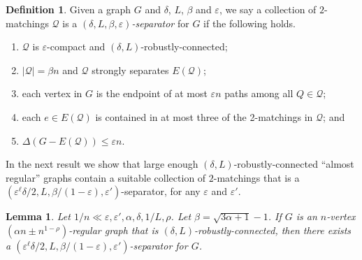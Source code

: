 \documentclass[a4paper, 11pt,reqno]{amsart}
\newcommand{\calQ}{\mathcal{Q}}
\theoremstyle{plain}
\newtheorem{lemma}[theorem]{Lemma}
\theoremstyle{definition}
\newtheorem{definition}[theorem]{Definition}
\numberwithin{equation}{section}
\newcommand{\eps}{\varepsilon}
\begin{document}
\begin{definition} \label{definition:separator}
  Given a graph $G$ and $\delta$, $L$, $\beta$ and $\eps$, we say a
  collection of $2$-matchings $\calQ$ is a \emph{$(\delta,
    L,\beta,\eps)$-separator} for $G$ if the following holds.
  \begin{enumerate}[\upshape{\textbf{(Q\arabic*)}},labelindent=0pt,labelwidth=\widthof{\ref{item:firstpacking-separating}},leftmargin=!]
  \item \label{item:firstpacking-connecting} $\calQ$ is $\eps$-compact and $(\delta,L)$-robustly-connected;
  \item \label{item:firstpacking-separating} $|\calQ| = \beta n$ and $\calQ$ strongly separates $E(\calQ)$;
  \item \label{item:firstpacking-endpoints} each vertex in $G$ is the endpoint of at most $\eps n$ paths among all $Q \in \calQ$;
  \item \label{item:firstpacking-sizes} each $e \in E(\calQ)$ is contained in at most three of the 2-matchings in $\calQ$; and
  \item \label{item:firstpacking-almostperfect}$\Delta(G - E(\calQ)) \leq \eps n$.
  \end{enumerate}
\end{definition}  

In the next result we show that large enough $(\delta, L)$-robustly-connected
``almost regular'' graphs contain a suitable collection of
$2$-matchings that is a $(\eps^\ell\delta/2, L,\beta/(1-\eps),\eps')$-separator, for any
$\eps$ and $\eps'$.

\begin{lemma} \label{lemma:firstpacking} Let $1/n \ll \eps, \eps',
  \alpha, \delta, 1/L, \rho$.  Let $\beta = \sqrt{3 \alpha + 1} - 1$.
  If $G$ is an $n$-vertex ${(\alpha n \pm n^{1 - \rho})}$-regular graph that is $(\delta,
  L)$-robustly-connected, then there exists a $(\eps^\ell\delta/2,
  L,\beta/(1-\eps),\eps')$-separator for $G$.
\end{lemma}
\end{document}
